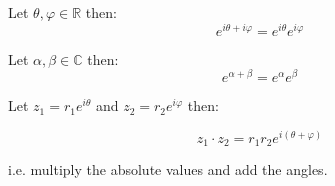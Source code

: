 \begin{thm}
	Let $\theta, \varphi \in \mathbb{R}$ then:
	\[e^{i\theta + i\varphi} = e^{i\theta}e^{i\varphi}\]
\end{thm}
\begin{thm}
	Let $\alpha, \beta \in \mathbb{C}$ then:
	\[e^{\alpha + \beta} = e^{\alpha}e^{\beta}\]
\end{thm}
\begin{thm}
	Let $z_1 = r_1 e^{i\theta}$ and $z_2 = r_2 e^{i\varphi}$ then:

	\[z_1 \cdot z_2 = r_1 r_2 e^{i(\theta + \varphi)} \]

	i.e. multiply the absolute values and add the angles.
\end{thm}